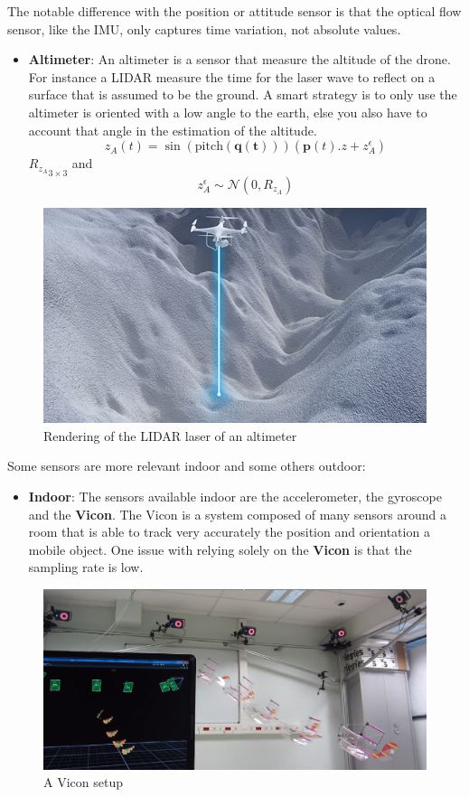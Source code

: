 \documentclass[12pt,]{article}
\providecommand{\tightlist}{%
  \setlength{\itemsep}{0pt}\setlength{\parskip}{0pt}}
\begin{document}
The notable difference with the position or attitude sensor is that the
optical flow sensor, like the IMU, only captures time variation, not
absolute values.

\begin{itemize}
\tightlist
\item
  \textbf{Altimeter}: An altimeter is a sensor that measure the altitude
  of the drone. For instance a LIDAR measure the time for the laser wave
  to reflect on a surface that is assumed to be the ground. A smart
  strategy is to only use the altimeter is oriented with a low angle to
  the earth, else you also have to account that angle in the estimation
  of the altitude.
  \[z_A(t) = \sin(\text{pitch}(\mathbf{q(t)}))(\mathbf{p}(t).z + z_A^\epsilon)\]
  \({R_{z_A}}_{3 \times 3}\) and
  \[z_A^\epsilon \sim \mathcal{N}(0, R_{z_A})\]
\end{itemize}

\begin{figure}
\centering
\includegraphics{altimeter.jpg}
\caption{Rendering of the LIDAR laser of an altimeter}
\end{figure}

Some sensors are more relevant indoor and some others outdoor:

\begin{itemize}
\tightlist
\item
  \textbf{Indoor}: The sensors available indoor are the accelerometer,
  the gyroscope and the \textbf{Vicon}. The Vicon is a system composed
  of many sensors around a room that is able to track very accurately
  the position and orientation a mobile object. One issue with relying
  solely on the \textbf{Vicon} is that the sampling rate is low.
\end{itemize}

\begin{figure}
\centering
\includegraphics{vicon.jpg}
\caption{A Vicon setup}
\end{figure}
\end{document}
